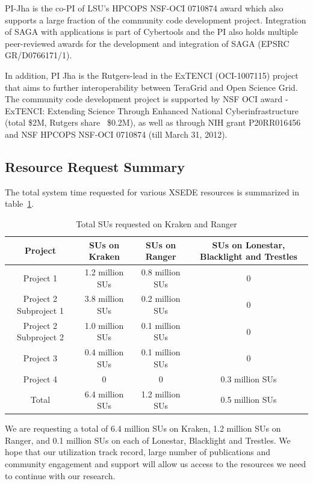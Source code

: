 \documentclass[a4paper,10pt]{article}
\newcommand{\up}{\vspace*{-1em}}
\begin{document}
PI-Jha is the co-PI of LSU's HPCOPS NSF-OCI 0710874 award which also supports a large fraction of the community code development project. Integration of SAGA with applications is part of Cybertools and the PI also holds multiple peer-reviewed awards for the development and integration of SAGA (EPSRC GR/D0766171/1). %

In addition, PI Jha is the Rutgers-lead in the ExTENCI (OCI-1007115) project that aims to further interoperability between TeraGrid and Open Science Grid.  The community code development project is supported by NSF OCI award - ExTENCI: Extending Science Through Enhanced National Cyberinfrastructure (total \$2M, Rutgers share ~\$0.2M), as well as through NIH grant P20RR016456 and NSF HPCOPS NSF-OCI 0710874 (till March 31, 2012).

\subsection*{Resource Request Summary}

The total system time requested for various XSEDE resources is summarized in table~\ref{table:systems}.
\begin{table}[!h]
\up
\begin{center}
\begin{tabular}{|c|c|c|c| }
\hline 
Project & SUs on Kraken & SUs on Ranger  & SUs on Lonestar, Blacklight and Trestles\\ 
\hline
Project 1 & 1.2 million SUs  & 0.8 million SUs & 0 \\
\hline
Project 2 Subproject 1 & 3.8 million SUs   & 0.2 million SUs & 0 \\
\hline
Project 2 Subproject 2 & 1.0 million SUs & 0.1 million SUs & 0\\
\hline
Project 3 & 0.4 million SUs & 0.1 million SUs & 0\\
\hline
Project 4 & 0 & 0 & 0.3 million SUs\\
\hline
\hline
Total  & 6.4 million SUs & 1.2 million SUs & 0.5 million SUs\\
\hline
\end{tabular}
\end{center}
  \caption{Total SUs requested on Kraken and Ranger}\label{table:systems}
\up
\end{table}
We are requesting a total of 6.4 million SUs on Kraken, 1.2 million SUs on Ranger, and 0.1 million SUs on each of Lonestar, Blacklight and Trestles. We hope that our utilization track record, large number of publications and community engagement and support will allow us access to the resources we need to continue with our research.




\end{document}
